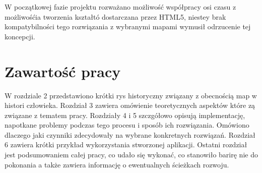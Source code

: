 W początkowej fazie projektu rozważano możliwość współpracy osi czasu z możliwośćia tworzenia kształtó dostarczana przez HTML5, niestey brak kompatybilności tego rozwiązania z wybranymi mapami wymusił odrzucenie tej koncepcji.

\section{Zawartość pracy}
\label{sec:zawartoscPracy}


W rozdziale 2 przedstawiono krótki rys historyczny związany z obecnością map w histori człowieka. Rozdział 3 zawiera omówienie teoretycznych aspektów które zą związane z tematem pracy. Rozdziały 4 i 5 szczgółowo opisują implementację, napotkane problemy podczas tego procesu i sposób ich rozwiązania. Omówiono dlaczego jaki czynniki zdecydowały na wybrane konkretnych rozwiązań. Rozdział 6 zawiera krótki przykład wykorzystania stworzonej aplikacji. Ostatni rozdział jest podsumowaniem całej pracy, co udało się wykonać, co stanowiło barirę nie do pokonania a także zawiera informację o ewentualnych ścieżkach rozwoju.















